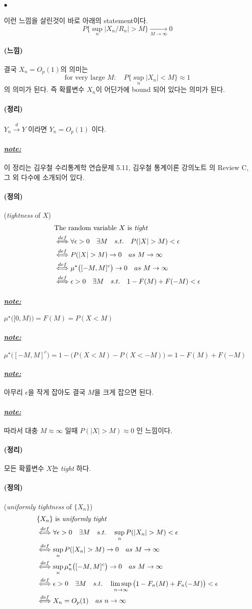 \documentclass[12pt,oneside,english]{book}
\def\ck{\paragraph{\Large$\bullet$}\Large}
\def\dfn{\paragraph{\Large(정의)}\Large}
\def\thm{\paragraph{\Large(정리)}\Large}
\def\fl{\paragraph{\Large(느낌)}\Large}
\def\note{\paragraph{\Large\textit{\underline{note:}}}\Large}
\begin{document}
\ck 이런 느낌을 살린것이 바로 아래의 statement이다. 
\[
P\{\sup_{n}|X_n / R_n| > M \} \underset{M\to\infty}{\to} 0
\]

\fl 결국 $X_n=O_p(1)$의 의미는 
\[
\mbox{for very large $M$}:\quad  P\{\sup_n|X_n| < M \} \approx 1 
\]
의 의미가 된다. 즉 확률변수 $X_n$이 어딘가에 bound 되어 있다는 의미가 된다. 

\thm $Y_n \overset{d}{\to} Y$ 이라면 $Y_n=O_p(1)$ 이다. 

\note 이 정리는 김우철 수리통계학 \cite{Kim2011}  연습문제 5.11, 김우철 통계이론 강의노트 \cite{Kim2012} 의 Review C, 그 외 다수에 소개되어 있다. 

\dfn (\emph{tightness} of $X$) 
\begin{align*}
& \mbox{The random variable $X$ is \emph{tight}} \\
& \overset{def}{\Longleftrightarrow} \forall \epsilon>0 \quad \exists M \quad s.t. \quad P(|X|>M)<\epsilon \\ 
& \overset{def}{\Longleftrightarrow} P(|X|>M) \to 0 \quad as ~ M\to \infty \\ 
& \overset{def}{\Longleftrightarrow} \mu^{\star}\big([-M,M]^c\big) \to 0 \quad as ~ M \to \infty \\ 
& \overset{def}{\Longleftrightarrow} \epsilon>0 \quad \exists M \quad s.t. \quad 1-F(M)+F(-M) < \epsilon 
\end{align*}

\note $\mu^{\star}\big([0,M)\big)=F(M)=P(X<M)$

\note $\mu^{\star}\big([-M,M]^c\big)=1-\big(P(X<M)-P(X<-M)\big)=1-F(M)+F(-M)$
\note 아무리 $\epsilon$을 작게 잡아도 결국 $M$을 크게 잡으면 된다. 

\note 따라서 대충 $M \approx \infty$ 일때 $P(|X|>M) \approx 0$ 인 느낌이다. 

\thm 모든 확률변수 $X$는 \emph{tight} 하다.
 
\dfn (\emph{uniformly tightness} of $\{X_n\}$) 
\begin{align*}
& \mbox{$\{X_n\}$ is \emph{uniformly tight}} \\
& \overset{def}{\Longleftrightarrow} \forall \epsilon>0 \quad \exists M \quad s.t. \quad \sup_nP(|X_n|>M)<\epsilon \\ 
& \overset{def}{\Longleftrightarrow} \sup_n P(|X_n|>M) \to 0 \quad as ~ M\to \infty \\ 
& \overset{def}{\Longleftrightarrow} \sup_n\mu_n^{\star}\big([-M,M]^c\big) \to 0 \quad as ~ M \to \infty \\ 
& \overset{def}{\Longleftrightarrow} \epsilon>0 \quad \exists M \quad s.t. \quad \limsup_{n\to\infty} \big(1-F_n(M)+F_n(-M)\big) < \epsilon \\ 
& \overset{def}{\Longleftrightarrow} X_n=O_p(1) \quad as ~ n\to\infty 
\end{align*}
\end{document}

